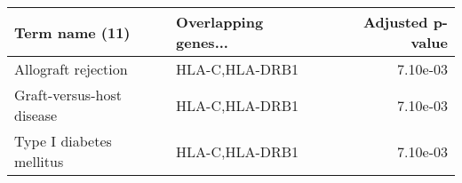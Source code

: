 \begin{tabular}{llr}
\toprule
           Term name (11) & Overlapping genes... &  Adjusted p-value \\
\midrule
      Allograft rejection &       HLA-C,HLA-DRB1 &          7.10e-03 \\
Graft-versus-host disease &       HLA-C,HLA-DRB1 &          7.10e-03 \\
 Type I diabetes mellitus &       HLA-C,HLA-DRB1 &          7.10e-03 \\
\bottomrule
\end{tabular}

